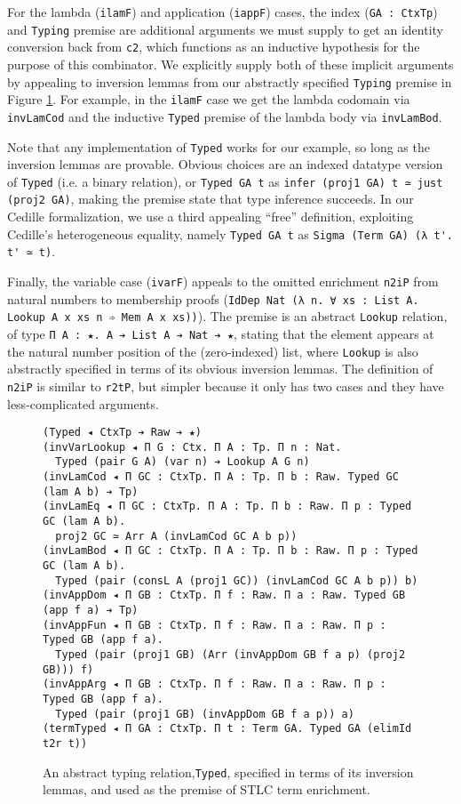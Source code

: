 \documentclass[acmsmall,screen]{acmart}
\newcommand{\reffig}[1]{Figure \ref{fig:#1}}
\newcommand{\labfig}[1]{\label{fig:#1}}
\begin{document}
For the lambda (\verb;ilamF;) and application (\verb;iappF;) cases,
the index (\verb;GA : CtxTp;) and \verb;Typing; premise are additional
arguments we must supply to get an identity conversion back from
\verb;c2;, which functions as an inductive hypothesis for the
purpose of this combinator. We explicitly supply both of these
implicit arguments by appealing to inversion lemmas from our
abstractly specified \verb;Typing; premise in \reffig{inv}. For
example, in the \verb;ilamF; case we get the lambda codomain via
\verb;invLamCod; and the inductive \verb;Typed; premise of the lambda
body via \verb;invLamBod;.

Note that any implementation of \verb;Typed; works for our example,
so long as the inversion lemmas are provable. Obvious choices are an
indexed datatype version of \verb;Typed; (i.e. a binary relation), or
\verb;Typed GA t; as \verb;infer (proj1 GA) t ≃ just (proj2 GA);,
making the premise state that type inference succeeds. In our
Cedille formalization, we use a third appealing ``free'' definition,
exploiting Cedille's heterogeneous equality, namely
\verb;Typed GA t; as \verb;Sigma (Term GA) (λ t'. t' ≃ t);.

Finally, the variable case (\verb;ivarF;) appeals to the omitted
enrichment \verb;n2iP; from natural numbers to membership proofs
(\verb;IdDep Nat (λ n. ∀ xs : List A. Lookup A x xs n ➾ Mem A x xs));).
The premise is an abstract \verb;Lookup; relation, of type
\verb;Π A : ★. A ➔ List A ➔ Nat ➔ ★;, stating that the element appears
at the natural number position of the (zero-indexed) list, where
\verb;Lookup; is also abstractly specified in terms of its obvious
inversion lemmas. The definition of \verb;n2iP; is similar to
\verb;r2tP;, but simpler because it only has two cases and they have
less-complicated arguments.



\begin{figure}
\centering

\begin{verbatim}
(Typed ◂ CtxTp ➔ Raw ➔ ★)
(invVarLookup ◂ Π G : Ctx. Π A : Tp. Π n : Nat. 
  Typed (pair G A) (var n) ➔ Lookup A G n)
(invLamCod ◂ Π GC : CtxTp. Π A : Tp. Π b : Raw. Typed GC (lam A b) ➔ Tp)
(invLamEq ◂ Π GC : CtxTp. Π A : Tp. Π b : Raw. Π p : Typed GC (lam A b).
  proj2 GC ≃ Arr A (invLamCod GC A b p))
(invLamBod ◂ Π GC : CtxTp. Π A : Tp. Π b : Raw. Π p : Typed GC (lam A b).
  Typed (pair (consL A (proj1 GC)) (invLamCod GC A b p)) b)
(invAppDom ◂ Π GB : CtxTp. Π f : Raw. Π a : Raw. Typed GB (app f a) ➔ Tp)
(invAppFun ◂ Π GB : CtxTp. Π f : Raw. Π a : Raw. Π p : Typed GB (app f a).
  Typed (pair (proj1 GB) (Arr (invAppDom GB f a p) (proj2 GB))) f)
(invAppArg ◂ Π GB : CtxTp. Π f : Raw. Π a : Raw. Π p : Typed GB (app f a).
  Typed (pair (proj1 GB) (invAppDom GB f a p)) a)
(termTyped ◂ Π GA : CtxTp. Π t : Term GA. Typed GA (elimId t2r t))
\end{verbatim}

\caption{An abstract typing relation,\texttt{Typed}, specified
  in terms of its inversion lemmas, and used as the premise of STLC term enrichment.}
\labfig{inv}
\end{figure}
\end{document}
